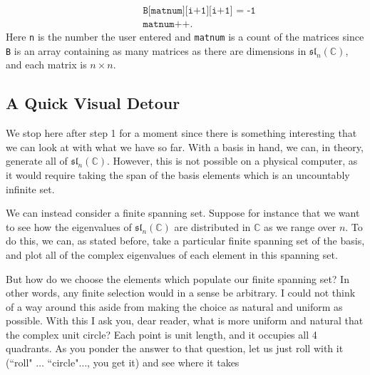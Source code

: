 \documentclass[12pt]{article}
\theoremstyle{definition}
\theoremstyle{definition}
\begin{document}
\begin{enumerate}
\begin{enumerate}
\begin{equation*}
\begin{split}
                            &\quad\quad\texttt{B[matnum][i+1][i+1] = -1} \\
                            &\quad\quad\texttt{matnum++}.
                        \end{split} 
                    \end{equation*}
                    Here \texttt{n} is the number the user entered and
                    \texttt{matnum} is a count of the matrices since \texttt{B}
                    is an array containing as many matrices as there are
                    dimensions in $\mathfrak{sl}_n(\mathbb{C})$, and each
                    matrix is $n\times n$.
            \end{enumerate}
    \end{enumerate}
    \subsection{A Quick Visual Detour}
        We stop here after step 1 for a moment since there is something
        interesting that we can look at with what we have so far. With a basis
        in hand, we can, in theory, generate all of
        $\mathfrak{sl}_n(\mathbb{C})$. However, this is not possible on
        a physical computer, as it
        would require taking the span of the basis elements which is an
        uncountably infinite set.\par\hspace{4mm} We can instead consider a finite spanning
        set. Suppose for instance that we want to see how the eigenvalues of
        $\mathfrak{sl}_n(\mathbb{C})$ are distributed in $\mathbb{C}$ as we
        range over $n$. To do this, we can, as stated before, take a particular
        finite spanning set of the basis, and plot all of the complex
        eigenvalues of each element in this spanning set.\par\hspace{4mm} But how do we choose
        the elements which populate our finite spanning set? In other words,
        any finite selection would in a sense be arbitrary. I could not think
        of a way around this aside from making the choice as natural and
        uniform as possible. With this I ask you, dear reader, what is more
        uniform and natural that the complex unit circle? Each point is unit
        length, and it occupies all 4 quadrants. As you ponder the
        answer to that question, let us just roll with it (``roll" $\dots$
        ``circle"$\dots$, you get it) and see where it takes
\end{document}
